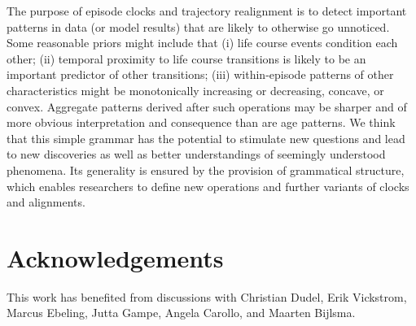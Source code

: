 \documentclass{article}
\begin{document}
The purpose of episode clocks and trajectory realignment is to detect important patterns in data (or model results) that are likely to otherwise go unnoticed. Some reasonable priors might include that (i) life course events condition each other; (ii) temporal proximity to life course transitions is likely to be an important predictor of other transitions; (iii) within-episode patterns of other characteristics might be monotonically increasing or decreasing, concave, or convex. Aggregate patterns derived after such operations may be sharper and of more obvious interpretation and consequence than are age patterns. We think that this simple grammar has the potential to stimulate new questions and lead to new discoveries as well as better understandings of seemingly understood phenomena. Its generality is ensured by the provision of grammatical structure, which enables researchers to define new operations and further variants of clocks and alignments.


\section*{Acknowledgements}
This work has benefited from discussions with Christian Dudel, Erik Vickstrom, Marcus Ebeling, Jutta Gampe, Angela Carollo, and Maarten Bijlsma. 

\FloatBarrier
\singlespacing

   
\end{document}
